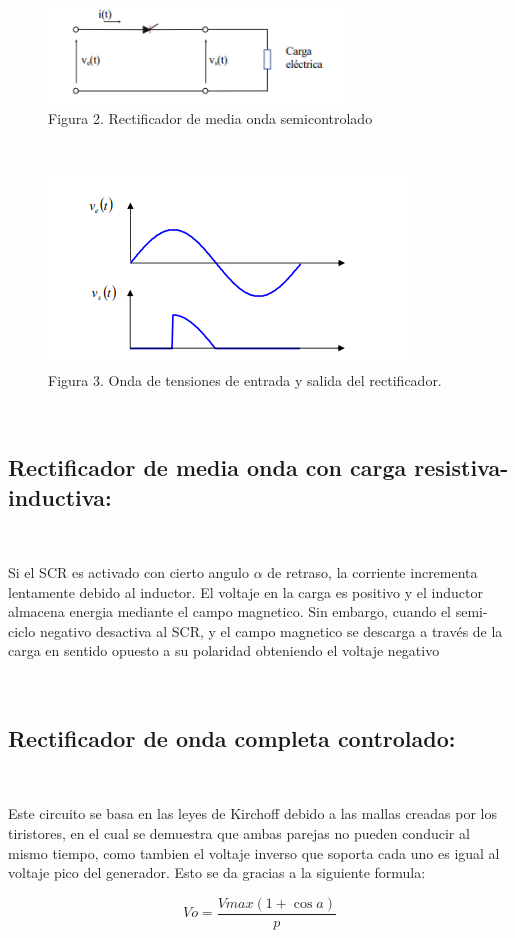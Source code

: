 \documentclass[12pt,letterpaper]{article}
\begin{document}
\begin{figure}[h!]
\begin{center}
\includegraphics[width=8cm]{Medio puente-Semicontrolado.png} 
\caption{ Figura 2. Rectificador de media onda semicontrolado}
\end{center}


\end{figure}

\

\begin{figure}
\begin{center}
\includegraphics[scale=1]{Onda de tension entrada y salida.png} 
\caption{ Figura 3. Onda de tensiones de entrada y salida del rectificador.}

\end{center}


\end{figure}

\

\subsection*{Rectificador de media onda con carga resistiva-inductiva:}
\

Si el SCR es activado con cierto angulo $\alpha$ de retraso, la corriente incrementa lentamente debido al inductor. El voltaje en la carga es positivo y el inductor almacena energia mediante el campo magnetico. Sin embargo, cuando el semi-ciclo negativo desactiva al SCR, y el campo magnetico se descarga a través de la carga en sentido opuesto a su polaridad obteniendo el voltaje negativo

\

\subsection{Rectificador de onda completa controlado:}
\

Este circuito se basa en las leyes de Kirchoff debido a las mallas creadas por los tiristores, en el cual se demuestra que ambas parejas no pueden conducir al mismo tiempo, como tambien el voltaje inverso que soporta cada uno es igual al voltaje pico del generador.
Esto se da gracias a la siguiente formula:

$$ Vo=\frac{Vmax(1+\cos a)}{p}$$ 
\end{document}

